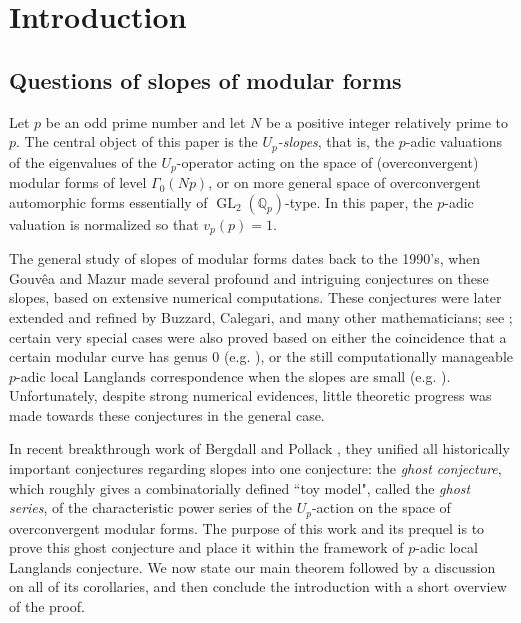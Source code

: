 \documentclass[12pt]{amsart}
\theoremstyle{definition}
\numberwithin{equation}{subsection}
\def\QQ{\mathbb{Q}}
\DeclareMathOperator{\GL}{GL}
\begin{document}
\maketitle
\setcounter{tocdepth}{1}
\tableofcontents


\section{Introduction}

\subsection{Questions of slopes of modular forms}
Let $p$ be an odd prime number and let $N$ be a positive integer relatively prime to $p$. The central object of this paper is the  \emph{$U_p$-slopes}, that is, the $p$-adic valuations of the eigenvalues of the $U_p$-operator acting on the space of (overconvergent) modular forms of level $\Gamma_0(Np)$, or on more general space of overconvergent automorphic forms essentially of $\GL_2(\QQ_p)$-type. In this paper, the $p$-adic valuation is normalized so that $v_p(p) =1$.

The general study of slopes of modular forms dates back to the 1990's, when Gouv\^ea and Mazur made several profound and intriguing conjectures on these slopes, based on extensive numerical computations. These conjectures were later extended and refined by Buzzard, Calegari, and many other mathematicians; see \cite{buzzard-slope,buzzard-calegari, clay, loeffler-slope};
certain very special cases were also proved based on either the coincidence that a certain modular curve has genus $0$ (e.g. \cite{buzzard-calegari}), or the still computationally manageable $p$-adic local Langlands correspondence when the slopes are small (e.g. \cite{buzzard-gee-reduction,ghate1,ghate2,ghate3,arsovski}).
Unfortunately, despite strong numerical evidences, little theoretic progress was made towards these conjectures in the general case.

In recent breakthrough work of Bergdall and Pollack \cite{bergdall-pollack2, bergdall-pollack3, bergdall-pollack4}, they unified all historically important conjectures regarding slopes into one conjecture: the \emph{ghost conjecture}, which roughly gives a combinatorially defined ``toy model", called the \emph{ghost series}, of the characteristic power series of the $U_p$-action on the space of overconvergent modular forms. 
The purpose of this work and its prequel \cite{liu-truong-xiao-zhao} is to prove this ghost conjecture and place it within the framework of $p$-adic local Langlands conjecture.  We now state our main theorem followed by a discussion on all of its corollaries, and then conclude the introduction with a short overview of the proof.
\end{document}
